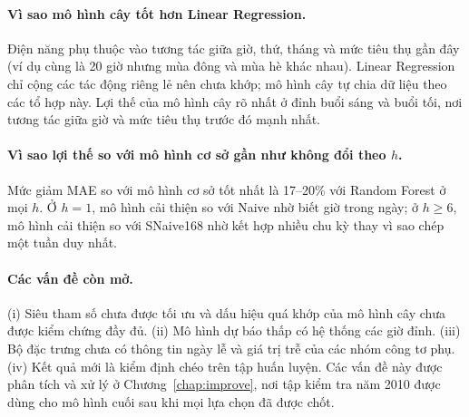 \paragraph{Vì sao mô hình cây tốt hơn Linear Regression.} Điện năng phụ thuộc vào tương tác giữa giờ, thứ, tháng và mức tiêu thụ gần đây (ví dụ cùng là 20 giờ nhưng mùa đông và mùa hè khác nhau). Linear Regression chỉ cộng các tác động riêng lẻ nên chưa khớp; mô hình cây tự chia dữ liệu theo các tổ hợp này. Lợi thế của mô hình cây rõ nhất ở đỉnh buổi sáng và buổi tối, nơi tương tác giữa giờ và mức tiêu thụ trước đó mạnh nhất.

\paragraph{Vì sao lợi thế so với mô hình cơ sở gần như không đổi theo $h$.} Mức giảm MAE so với mô hình cơ sở tốt nhất là 17--20\% với Random Forest ở mọi $h$. Ở $h = 1$, mô hình cải thiện so với Naive nhờ biết giờ trong ngày; ở $h \ge 6$, mô hình cải thiện so với SNaive168 nhờ kết hợp nhiều chu kỳ thay vì sao chép một tuần duy nhất.

\paragraph{Các vấn đề còn mở.} (i) Siêu tham số chưa được tối ưu và dấu hiệu quá khớp của mô hình cây chưa được kiểm chứng đầy đủ. (ii) Mô hình dự báo thấp có hệ thống các giờ đỉnh. (iii) Bộ đặc trưng chưa có thông tin ngày lễ và giá trị trễ của các nhóm công tơ phụ. (iv) Kết quả mới là kiểm định chéo trên tập huấn luyện. Các vấn đề này được phân tích và xử lý ở Chương~\ref{chap:improve}, nơi tập kiểm tra năm 2010 được dùng cho mô hình cuối sau khi mọi lựa chọn đã được chốt.
